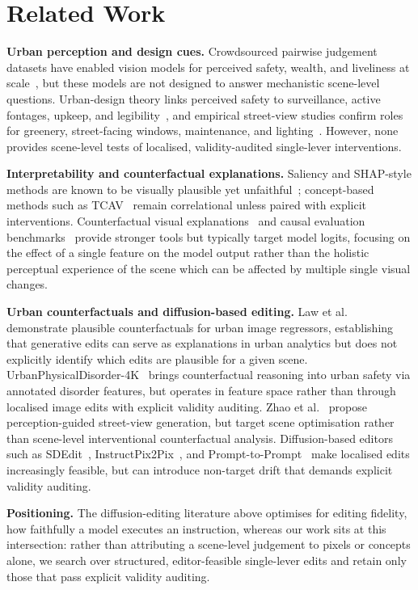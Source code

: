 \section{Related Work}

\noindent\textbf{Urban perception and design cues.}
Crowdsourced pairwise judgement datasets have enabled vision models for
perceived safety, wealth, and liveliness at
scale~\cite{salesses2013,naik2014,dubey2016,quintana2025}, but these
models are not designed to answer mechanistic scene-level questions.
Urban-design theory links perceived safety to surveillance, active fontages,
upkeep, and legibility~\cite{jacobs1961,newman1972,loewen1993}, and
empirical street-view studies confirm roles for greenery, street-facing
windows, maintenance, and lighting~\cite{li2015greenery,denadai2016lively,jiang2018brokenwindows,portnov2020lighting}. However, none provides scene-level tests of localised, validity-audited
single-lever interventions.

\noindent\textbf{Interpretability and counterfactual explanations.}
Saliency and SHAP-style methods are known to be visually plausible yet
unfaithful~\cite{adebayo2018}; concept-based methods such as
TCAV~\cite{kim2018} remain correlational unless paired with explicit
interventions. Counterfactual visual explanations~\cite{goyal2019} and
causal evaluation benchmarks~\cite{melistas2024} provide stronger tools
but typically target model logits, focusing on the effect of a single feature on the model output rather than the holistic perceptual experience of the scene which can be affected by multiple single visual changes.

\noindent\textbf{Urban counterfactuals and diffusion-based editing.}
Law et al.~\cite{law2023} demonstrate plausible counterfactuals for
urban image regressors, establishing that generative edits can serve as
explanations in urban analytics but does not explicitly identify which edits are plausible for a given scene. UrbanPhysicalDisorder-4K~\cite{vera2025} brings counterfactual reasoning
into urban safety via annotated disorder features, but operates in
feature space rather than through localised image edits with explicit
validity auditing. Zhao et al.~\cite{zhao2026} propose
perception-guided street-view generation, but target scene optimisation
rather than scene-level interventional counterfactual analysis.
Diffusion-based editors such as SDEdit~\cite{meng2022},
InstructPix2Pix~\cite{brooks2023}, and
Prompt-to-Prompt~\cite{hertz2023prompt} make localised edits
increasingly feasible, but can introduce non-target drift that demands
explicit validity auditing.

\noindent\textbf{Positioning.}
The diffusion-editing literature above optimises for editing
fidelity, how faithfully a model executes an instruction, whereas our work sits at this intersection: rather than attributing a scene-level judgement to pixels or concepts alone, we search over structured, editor-feasible single-lever edits and retain only those that pass explicit validity auditing.